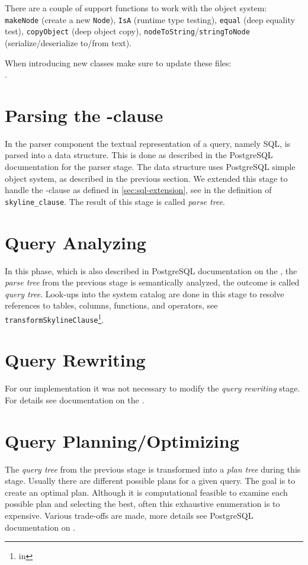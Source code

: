 There are a couple of support functions to work with the object
system: \texttt{makeNode} (create a new \texttt{Node}), \texttt{IsA}
(runtime type testing), \texttt{equal} (deep equality test),
\texttt{copyObject} (deep object copy),
\texttt{nodeToString}/\texttt{stringToNode} (serialize/deserialize
to/from text).

\noindent
When introducing new classes make sure to update these files: \\
.

\section{Parsing the -clause}
In the parser component the textual representation of a query, namely
SQL, is parsed into a data structure.  This is done as described in
the PostgreSQL documentation for the 
{parser stage}.  The data structure uses PostgreSQL simple object
system, as described in the previous section.  We extended this stage
to handle the -clause as defined in
\autoref{sec:sql-extension}, see in 
the definition of \texttt{skyline\_clause}.  The result of this
stage is called \emph{parse tree}.

\section{Query Analyzing}
In this phase, which is also described in PostgreSQL documentation on the
, the \emph{parse tree}
from the previous stage is semantically analyzed, the outcome is
called \emph{query tree}.  Look-ups into the system catalog are done in
this stage to resolve references to tables, columns, functions, and
operators, see \texttt{transformSkylineClause}\footnote{in
}.

\section{Query Rewriting}
For our implementation it was not necessary to modify the \emph{query
rewriting} stage.  For details see documentation on the
.

\section{Query Planning/Optimizing}
The \emph{query tree} from the previous stage is transformed into a
\emph{plan tree} during this stage.  Usually there are different
possible plans for a given query.  The goal is to create an optimal
plan.  Although it is computational feasible to examine each possible
plan and selecting the best, often this exhaustive enumeration is
to expensive.  
%
Various trade-offs are made, more details see PostgreSQL documentation
on .

